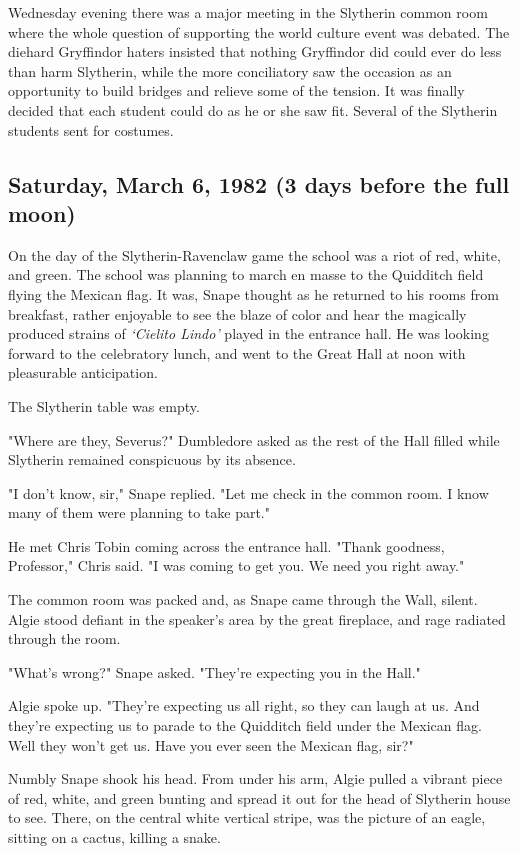 Wednesday evening there was a major meeting in the Slytherin common room where the whole question of supporting the world culture event was debated. The diehard Gryffindor haters insisted that nothing Gryffindor did could ever do less than harm Slytherin, while the more conciliatory saw the occasion as an opportunity to build bridges and relieve some of the tension. It was finally decided that each student could do as he or she saw fit. Several of the Slytherin students sent for costumes.

\subsection{Saturday, March 6, 1982 (3 days before the full moon)}

On the day of the Slytherin-Ravenclaw game the school was a riot of red, white, and green. The school was planning to march en masse to the Quidditch field flying the Mexican flag. It was, Snape thought as he returned to his rooms from breakfast, rather enjoyable to see the blaze of color and hear the magically produced strains of \emph{`Cielito Lindo'} played in the entrance hall. He was looking forward to the celebratory lunch, and went to the Great Hall at noon with pleasurable anticipation.

The Slytherin table was empty.

"Where are they, Severus?" Dumbledore asked as the rest of the Hall filled while Slytherin remained conspicuous by its absence.

"I don't know, sir," Snape replied. "Let me check in the common room. I know many of them were planning to take part."

He met Chris Tobin coming across the entrance hall. "Thank goodness, Professor," Chris said. "I was coming to get you. We need you right away."

The common room was packed and, as Snape came through the Wall, silent. Algie stood defiant in the speaker's area by the great fireplace, and rage radiated through the room.

"What's wrong?" Snape asked. "They're expecting you in the Hall."

Algie spoke up. "They're expecting us all right, so they can laugh at us. And they're expecting us to parade to the Quidditch field under the Mexican flag. Well they won't get us. Have you ever seen the Mexican flag, sir?"

Numbly Snape shook his head. From under his arm, Algie pulled a vibrant piece of red, white, and green bunting and spread it out for the head of Slytherin house to see. There, on the central white vertical stripe, was the picture of an eagle, sitting on a cactus, killing a snake.


